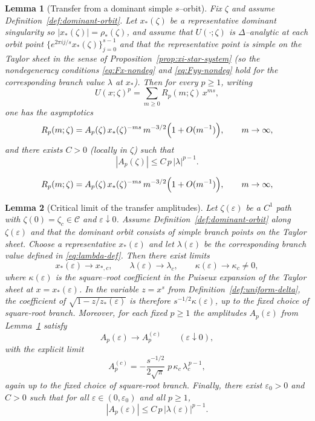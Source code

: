 \documentclass[10pt,a4paper]{amsart}
\newtheorem{lemma}{Lemma}
\begin{document}
\begin{lemma}[Transfer from a dominant simple $s$--orbit]\label{lem:coeff-asymp-dominant}
	Fix $\zeta$ and assume Definition~\ref{def:dominant-orbit}. Let $x_*(\zeta)$ be a representative
	dominant singularity so $|x_*(\zeta)|=\rho_*(\zeta)$, and assume that $U(\cdot;\zeta)$ is
	$\Delta$--analytic at each orbit point $\{e^{2\pi i j/s}x_*(\zeta)\}_{j=0}^{s-1}$ and that the
	representative point is \emph{simple} on the Taylor sheet in the sense of Proposition~\ref{prop:xi-star-system} (so the nondegeneracy conditions \eqref{eq:Fx-nondeg} and \eqref{eq:Fyy-nondeg} hold for the corresponding branch value $\lambda$ at $x_*$).
	Then for every $p\ge1$, writing
	\[
		U(x;\zeta)^p=\sum_{m\ge0} R_p(m;\zeta)\,x^{ms},
	\]
	one has the asymptotics
	\begin{equation}\label{eq:Rp-asymp}
		R_p(m;\zeta)=A_p(\zeta)\,x_*(\zeta)^{-ms}\,m^{-3/2}\Bigl(1+O(m^{-1})\Bigr),
		\qquad m\to\infty,
	\end{equation}
	and there exists $C>0$ (locally in $\zeta$) such that
	\[
		|A_p(\zeta)|\le C\,p\,|\lambda|^{p-1}.
	\]
\end{lemma}

	\begin{equation}
		R_p(m;\zeta)=A_p(\zeta)\,x_*(\zeta)^{-ms}\,m^{-3/2}\Bigl(1+O(m^{-1})\Bigr),
		\qquad m\to\infty,
	\end{equation}

\begin{lemma}[Critical limit of the transfer amplitudes]\label{lem:critical-coeff-asymp}
	Let $\zeta(\varepsilon)$ be a $C^1$ path with $\zeta(0)=\zeta_c\in\mathcal C$ and $\varepsilon\downarrow0$.
	Assume Definition~\ref{def:dominant-orbit} along $\zeta(\varepsilon)$ and that the dominant orbit consists
	of simple branch points on the Taylor sheet. Choose a representative $x_*(\varepsilon)$ and let
	$\lambda(\varepsilon)$ be the corresponding branch value defined in \eqref{eq:lambda-def}.
	Then there exist limits
	\[
		x_*(\varepsilon)\to x_{*,c},\qquad
		\lambda(\varepsilon)\to \lambda_c,\qquad
		\kappa(\varepsilon)\to\kappa_c\neq0,
	\]
	where $\kappa(\varepsilon)$ is the square--root coefficient in the Puiseux expansion of the Taylor sheet
	at $x=x_*(\varepsilon)$. In the variable \(z=x^s\) from
	Definition~\ref{def:uniform-delta}, the coefficient of
	\(\sqrt{1-z/z_*(\varepsilon)}\) is therefore
	\(s^{-1/2}\kappa(\varepsilon)\), up to the fixed choice of square-root branch.
	Moreover, for each fixed $p\ge1$ the amplitudes $A_p(\varepsilon)$ from Lemma~\ref{lem:coeff-asymp-dominant}
	satisfy
	\[
		A_p(\varepsilon)\to A_p^{(c)}\qquad (\varepsilon\downarrow0),
	\]
	with the explicit limit
	\begin{equation}\label{eq:Ap-critical-explicit}
	A_p^{(c)}
	=
	-\frac{s^{-1/2}}{2\sqrt{\pi}}\;p\,\kappa_c\,\lambda_c^{\,p-1},
	\end{equation}
	again up to the fixed choice of square-root branch. Finally, there exist $\varepsilon_0>0$ and
	$C>0$ such that for all $\varepsilon\in(0,\varepsilon_0)$ and all $p\ge1$,
	\[
		|A_p(\varepsilon)|\le C\,p\,|\lambda(\varepsilon)|^{p-1}.
	\]
\end{lemma}
\end{document}
